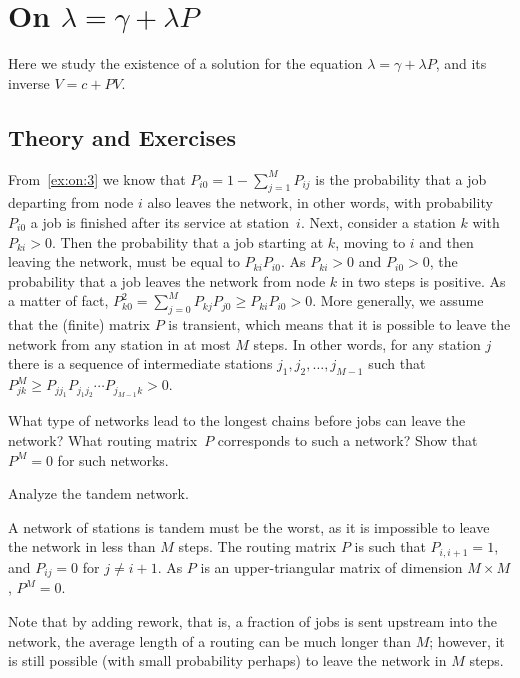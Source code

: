 \section{On $\lambda = \gamma + \lambda P$}
\label{sec:lambda-=-gamma}

Here we study the existence of a solution for the equation $\lambda = \gamma + \lambda P$, and its inverse $V = c + P V$. 

\subsection*{Theory and Exercises}



From~\cref{ex:on:3} we know that $P_{i0} = 1-\sum_{j=1}^M P_{ij}$ is the probability that a job departing from node $i$ also leaves the network, in other words, with probability $P_{i 0}$ a job is finished after its service at station~$i$.
Next, consider a station $k$ with $P_{ki} > 0$.
Then the probability that a job starting at $k$, moving to $i$ and then leaving the network, must be equal to $P_{ki}P_{i0}$.
As $P_{ki}>0$ and $P_{i0}>0$, the probability that a job leaves the network from node $k$ in two steps is positive.
As a matter of fact, $P^2_{k0} = \sum_{j=0}^M P_{kj}P_{j0} \geq P_{ki}P_{i0} > 0$.
More generally, we assume that the (finite) matrix $P$ is transient, which means that it is possible to leave the network from any station in at most $M$ steps.
In other words, for any station $j$ there is a sequence of intermediate stations $j_1, j_2, \ldots , j_{M-1}$ such that $P^{M}_{jk} \geq P_{j j_1}P_{j_1 j_2}\cdots P_{j_{M-1}k} > 0$.

\begin{extra}
  What type of networks lead to the longest chains before jobs can leave the network? What routing matrix~$P$ corresponds to such a network? Show that $P^M = 0$ for such networks.
\begin{hint}
Analyze the tandem network.    
\end{hint}
\begin{solution}
  A network of stations is tandem must be the worst, as it is impossible to leave the network in less than $M$ steps. The routing matrix $P$ is such that $P_{i, i+1} = 1$, and $P_{i j} = 0$ for $j\neq i+1$. As $P$ is an upper-triangular matrix of dimension $M\times M$, $P^M =0$. 

  Note that by adding rework, that is, a fraction of jobs is sent upstream into the network, the average length of a routing can be much longer than $M$; however, it is still possible (with small probability perhaps) to leave the network in $M$ steps.
\end{solution}
\end{extra}


